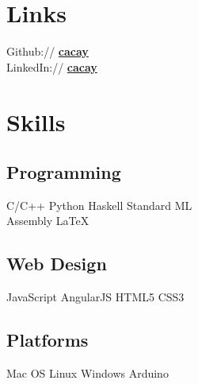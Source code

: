 \documentclass[letterpaper]{deedy-resume} %
\begin{document}
\begin{minipage}[t]{0.33\textwidth} %


\section{Links} 

Github:// \href{https://github.com/cacay}{\bf cacay} \\
LinkedIn:// \href{https://www.linkedin.com/in/cacay}{\bf cacay}

\sectionspace %


\section{Skills}

\subsection{Programming}

C/C++ \textbullet{} Python \textbullet{} Haskell \textbullet{} Standard ML \\
Assembly \textbullet{} \LaTeX\

\sectionspace %


\subsection{Web Design}

JavaScript \textbullet{} AngularJS \textbullet{} HTML5 \textbullet{} CSS3

\sectionspace %


\subsection{Platforms}

Mac OS \textbullet{} Linux \textbullet{} Windows \textbullet{} Arduino


\end{minipage}
\end{document}
